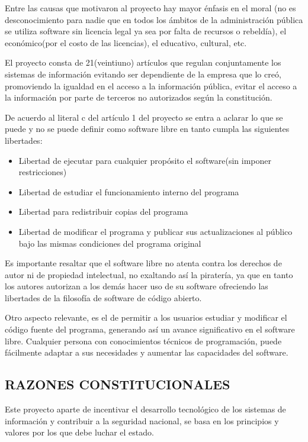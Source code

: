 Entre las causas que motivaron al proyecto hay mayor énfasis en
el moral (no es desconocimiento para nadie que en todos los
ámbitos de la administración pública se utiliza software sin
licencia legal ya sea por falta de recursos o rebeldía), el
económico(por el costo de las licencias), el educativo, cultural,
etc.

El proyecto consta de 21(veintiuno) artículos que regulan
conjuntamente los sistemas de información evitando ser
dependiente de la empresa que lo creó, promoviendo la igualdad
en el acceso a la información pública, evitar el acceso a la
información por parte de terceros no autorizados según la
constitución.

De acuerdo al literal c del artículo 1 del proyecto se entra a
aclarar lo que se puede y no se puede definir como software
libre en tanto cumpla las siguientes libertades:

\begin{itemize}
  \item Libertad de ejecutar para cualquier propósito el
	software(sin imponer restricciones)
  \item Libertad de estudiar el funcionamiento interno del
	programa
  \item Libertad para redistribuir copias del programa
  \item Libertad de modificar el programa y publicar sus
	actualizaciones al público bajo las mismas condiciones del
	programa original
\end{itemize}

Es importante resaltar que el software libre no atenta contra los
derechos de autor ni de propiedad intelectual, no exaltando así
la piratería, ya que en tanto los autores autorizan a los demás
hacer uso de su software ofreciendo las libertades de la filosofía
de software de código abierto.

Otro aspecto relevante, es el de permitir a los usuarios estudiar
y modificar el código fuente del programa, generando así un
avance significativo en el software libre. Cualquier persona con
conocimientos técnicos de programación, puede fácilmente
adaptar a sus necesidades y aumentar las capacidades del
software.

\subsection*{RAZONES CONSTITUCIONALES}
Este proyecto aparte de incentivar el desarrollo tecnológico de
los sistemas de información y contribuir a la seguridad nacional,
se basa en los principios y valores por los que debe luchar el
estado.

